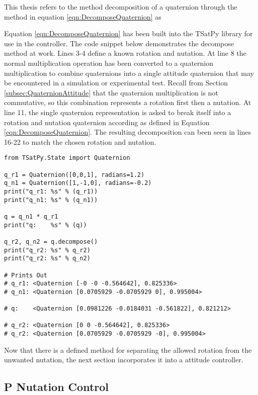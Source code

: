 This thesis refers to the method decomposition of a quaternion through the method in equation \ref{eqn:DecomposeQuaternion} as


Equation \ref{eqn:DecomposeQuaternion} has been built into the TSatPy library for use in the controller.  The code snippet below demonstrates the decompose method at work.  Lines 3-4 define a known rotation and nutation.  At line 8 the normal multiplication operation has been converted to a quaternion multiplication to combine quaternions into a single attitude quaternion that may be encountered in a simulation or experimental test.  Recall from Section \ref{subsec:QuaternionAttitude} that the quaternion multiplication is not commutative, so this combination represents a rotation first then a nutation.  At line 11, the single quaternion representation is asked to break itself into a rotation and nutation quaternion according as defined in Equation \ref{eqn:DecomposeQuaternion}.  The resulting decomposition can been seen in lines 16-22 to match the chosen rotation and nutation.

\begin{singlespace}
  \begin{verbatim}
from TSatPy.State import Quaternion

q_r1 = Quaternion([0,0,1], radians=1.2)
q_n1 = Quaternion([1,-1,0], radians=-0.2)
print("q_r1: %s" % (q_r1))
print("q_n1: %s" % (q_n1))

q = q_n1 * q_r1
print("q:    %s" % (q))

q_r2, q_n2 = q.decompose()
print("q_r2: %s" % q_r2)
print("q_r2: %s" % q_n2)

# Prints Out
# q_r1: <Quaternion [-0 -0 -0.564642], 0.825336>
# q_n1: <Quaternion [0.0705929 -0.0705929 0], 0.995004>

# q:    <Quaternion [0.0981226 -0.0184031 -0.561822], 0.821212>

# q_r2: <Quaternion [0 0 -0.564642], 0.825336>
# q_r2: <Quaternion [0.0705929 -0.0705929 -0], 0.995004>
  \end{verbatim}
\nocite{minted}
\end{singlespace}

Now that there is a defined method for separating the allowed rotation from the unwanted nutation, the next section incorporates it into a attitude controller.

\subsection{P Nutation Control}
\label{subsec:PNutationControl}

